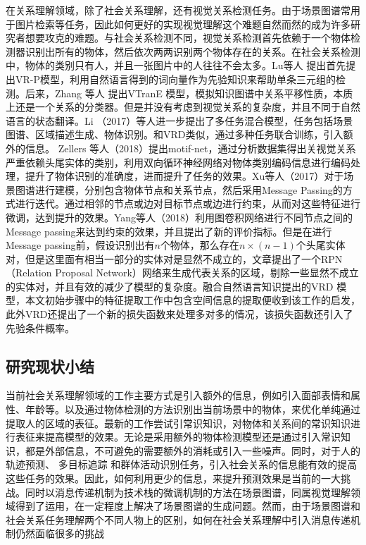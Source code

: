 在关系理解领域，除了社会关系理解，还有视觉关系检测任务。由于场景图谱常用于图片检索\cite{johnson2015image}等任务，因此如何更好的实现视觉理解这个难题自然而然的成为许多研究者想要攻克的难题。与社会关系检测不同，视觉关系检测首先依赖于一个物体检测器识别出所有的物体，然后依次两两识别两个物体存在的关系。在社会关系检测中，物体的类别只有人，并且一张图片中的人往往不会太多。Lu等人\cite{lu2016visual} 提出首先提出VR-P模型，利用自然语言得到的词向量作为先验知识来帮助单条三元组的检测。后来，Zhang 等人\cite{zhang2017visual} 提出VTranE 模型，模拟知识图谱中关系平移性质，本质上还是一个关系的分类器。但是并没有考虑到视觉关系的复杂度，并且不同于自然语言的状态翻译。Li （2017）等人\cite{li2017scene}进一步提出了多任务混合模型，任务包括场景图谱、区域描述生成、物体识别。和VRD类似，通过多种任务联合训练，引入额外的信息。
Zellers 等人（2018）\cite{zellers2018neural}提出motif-net，通过分析数据集得出关视觉关系严重依赖头尾实体的类别，利用双向循环神经网络对物体类别编码信息进行编码处理，提升了物体识别的准确度，进而提升了任务的效果。Xu等人（2017）对于场景图谱进行建模，分别包含物体节点和关系节点，然后采用Message Passing的方式进行迭代。通过相邻的节点或边对目标节点或边进行约束，从而对这些特征进行微调，达到提升的效果。Yang等人（2018）利用图卷积网络进行不同节点之间的Message passing来达到约束的效果，并且提出了新的评价指标。但是在进行Message passing前，假设识别出有$n$个物体，那么存在$n \times (n-1)$个头尾实体对，但是这里面有相当一部分的实体对是显然不成立的，文章提出了一个RPN（Relation Proposal Network）网络来生成代表关系的区域，剔除一些显然不成立的实体对，并且有效的减少了模型的复杂度。融合自然语言知识提出的VRD 模型\cite{liang2018visual}，本文初始步骤中的特征提取工作中包含空间信息的提取便收到该工作的启发，此外VRD还提出了一个新的损失函数来处理多对多的情况，该损失函数还引入了先验条件概率。

\subsection{研究现状小结}
当前社会关系理解领域的工作主要方式是引入额外的信息，例如引入面部表情和属性、年龄等。以及通过物体检测的方法识别出当前场景中的物体，来优化单纯通过提取人的区域的表征。最新的工作尝试引常识知识，对物体和关系间的常识知识进行表征来提高模型的效果。无论是采用额外的物体检测模型还是通过引入常识知识，都是外部信息，不可避免的需要额外的消耗或引入一些噪声。同时，对于人的轨迹预测、 多目标追踪 和群体活动识别任务，引入社会关系的信息能有效的提高这些任务的效果。因此，如何利用更少的信息，来提升预测效果是当前的一大挑战。同时以消息传递机制为技术栈的微调机制的方法在场景图谱，同属视觉理解领域得到了运用，在一定程度上解决了场景图谱的生成问题。然而，由于场景图谱和社会关系任务理解两个不同人物上的区别，如何在社会关系理解中引入消息传递机制仍然面临很多的挑战

